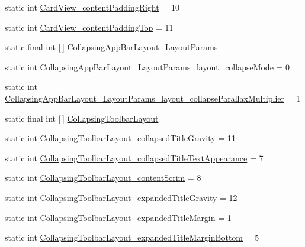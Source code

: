 \begin{DoxyCompactItemize}
\item 
static int \hyperlink{classandroid_1_1support_1_1v7_1_1appcompat_1_1R_1_1styleable_a43d4e86a2f022aedbbe56703d2f7dc0e}{Card\+View\+\_\+content\+Padding\+Right} = 10
\item 
static int \hyperlink{classandroid_1_1support_1_1v7_1_1appcompat_1_1R_1_1styleable_a0e2d945fc1d11acbc555543a3d7be2bf}{Card\+View\+\_\+content\+Padding\+Top} = 11
\item 
static final int \mbox{[}$\,$\mbox{]} \hyperlink{classandroid_1_1support_1_1v7_1_1appcompat_1_1R_1_1styleable_a12010970910a1c80a9bf9f6983f00001}{Collapsing\+App\+Bar\+Layout\+\_\+\+Layout\+Params}
\item 
static int \hyperlink{classandroid_1_1support_1_1v7_1_1appcompat_1_1R_1_1styleable_ab64b1431cc65e19392ff67fdd7a12d3c}{Collapsing\+App\+Bar\+Layout\+\_\+\+Layout\+Params\+\_\+layout\+\_\+collapse\+Mode} = 0
\item 
static int \hyperlink{classandroid_1_1support_1_1v7_1_1appcompat_1_1R_1_1styleable_a781b2b43f44b07db5eb37ae584beb420}{Collapsing\+App\+Bar\+Layout\+\_\+\+Layout\+Params\+\_\+layout\+\_\+collapse\+Parallax\+Multiplier} = 1
\item 
static final int \mbox{[}$\,$\mbox{]} \hyperlink{classandroid_1_1support_1_1v7_1_1appcompat_1_1R_1_1styleable_a8d282d917f35e5a08dd37db243410383}{Collapsing\+Toolbar\+Layout}
\item 
static int \hyperlink{classandroid_1_1support_1_1v7_1_1appcompat_1_1R_1_1styleable_aca00ebe0643a3a5ded86879fbff26955}{Collapsing\+Toolbar\+Layout\+\_\+collapsed\+Title\+Gravity} = 11
\item 
static int \hyperlink{classandroid_1_1support_1_1v7_1_1appcompat_1_1R_1_1styleable_af3614fd0af2e5e72723efefdb3be481a}{Collapsing\+Toolbar\+Layout\+\_\+collapsed\+Title\+Text\+Appearance} = 7
\item 
static int \hyperlink{classandroid_1_1support_1_1v7_1_1appcompat_1_1R_1_1styleable_a9bd6e1eb8c17d8f0f33567b77c829a5a}{Collapsing\+Toolbar\+Layout\+\_\+content\+Scrim} = 8
\item 
static int \hyperlink{classandroid_1_1support_1_1v7_1_1appcompat_1_1R_1_1styleable_adbe8dfae693ce3de1ae6617648f8652c}{Collapsing\+Toolbar\+Layout\+\_\+expanded\+Title\+Gravity} = 12
\item 
static int \hyperlink{classandroid_1_1support_1_1v7_1_1appcompat_1_1R_1_1styleable_aa0c9f6ddca433d8759b5d37b92f038f0}{Collapsing\+Toolbar\+Layout\+\_\+expanded\+Title\+Margin} = 1
\item 
static int \hyperlink{classandroid_1_1support_1_1v7_1_1appcompat_1_1R_1_1styleable_a9921e0babb5ad3a5043223af603a47c0}{Collapsing\+Toolbar\+Layout\+\_\+expanded\+Title\+Margin\+Bottom} = 5

\end{DoxyCompactItemize}
